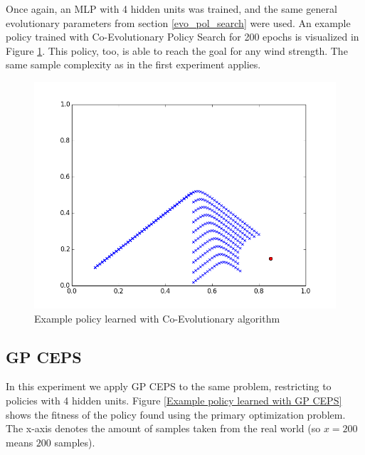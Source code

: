 Once again, an MLP with 4 hidden units was trained, and the same general evolutionary parameters from section \ref{evo_pol_search} were used. An example policy trained with Co-Evolutionary Policy Search for 200 epochs is visualized in Figure \ref{Example policy learned with Co-Evolutionary algorithm}. This policy, too, is able to reach the goal for any wind strength. The same sample complexity as in the first experiment applies.


\begin{figure}[ht]
  \centering
  \includegraphics[scale=0.5]{images/co_evo_result.png}
  \caption{Example policy learned with Co-Evolutionary algorithm}\label{Example policy learned with Co-Evolutionary algorithm}
\end{figure}

\subsection{GP CEPS}

In this experiment we apply GP CEPS to the same problem, restricting to policies with 4 hidden units. Figure \ref{Example policy learned with GP CEPS} shows the fitness of the policy found using the primary optimization problem. The x-axis denotes the amount of samples taken from the real world (so $x=200$ means $200$ samples). 


